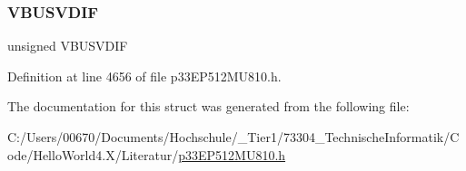 \mbox{\label{structtag_u1_o_t_g_i_r_b_i_t_s_af4c95445eb3d90765ad709ca1a6f9d59}} 
\subsubsection{\texorpdfstring{V\+B\+U\+S\+V\+D\+IF}{VBUSVDIF}}
{\footnotesize\ttfamily unsigned V\+B\+U\+S\+V\+D\+IF}



Definition at line 4656 of file p33\+E\+P512\+M\+U810.\+h.



The documentation for this struct was generated from the following file\+:\begin{DoxyCompactItemize}
\item 
C\+:/\+Users/00670/\+Documents/\+Hochschule/\+\_\+\+Tier1/73304\+\_\+\+Technische\+Informatik/\+Code/\+Hello\+World4.\+X/\+Literatur/\hyperlink{p33_e_p512_m_u810_8h}{p33\+E\+P512\+M\+U810.\+h}\end{DoxyCompactItemize}

